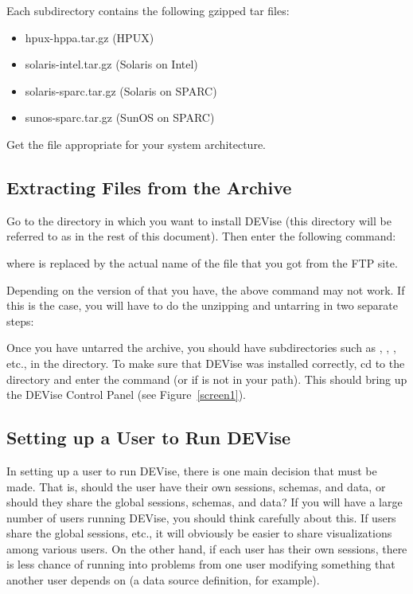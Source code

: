 Each subdirectory contains the following gzipped tar files:

\begin{itemize}
	\item hpux-hppa.tar.gz (HPUX)
	\item solaris-intel.tar.gz (Solaris on Intel)
	\item solaris-sparc.tar.gz (Solaris on SPARC)
	\item sunos-sparc.tar.gz (SunOS on SPARC)
\end{itemize}

Get the file appropriate for your system architecture.

\subsection{Extracting Files from the  Archive}


Go to the directory in which you want to install DEVise (this directory will be referred to
as  in the rest of this document).  Then enter the following command:


where  is replaced by the actual name of the file that you got from the FTP
site.

Depending on the version of  that you have, the above command may not work.  If this
is the case, you will have to do the unzipping and untarring in two separate steps:


Once you have untarred the archive, you should have subdirectories such as ,
, , etc.,
in the  directory.  To make sure that DEVise was installed correctly, cd
to the  directory and enter the command  (or  if
 is not in your path).  This should bring up the DEVise Control Panel (see
Figure~\ref{screen1}).

\subsection{Setting up a User to Run DEVise}

In setting up a user to run DEVise, there is one main decision that must be made.  That
is, should the user have their own sessions, schemas, and data, or should they share
the global sessions, schemas, and data?  If you will have a large number of users running
DEVise, you should think carefully about this.  If users share the global sessions, etc.,
it will obviously be easier to share visualizations among various users.  On the other hand,
if each user has their own sessions, there is less chance of running into problems from
one user modifying something that another user depends on (a data source definition, for
example).

